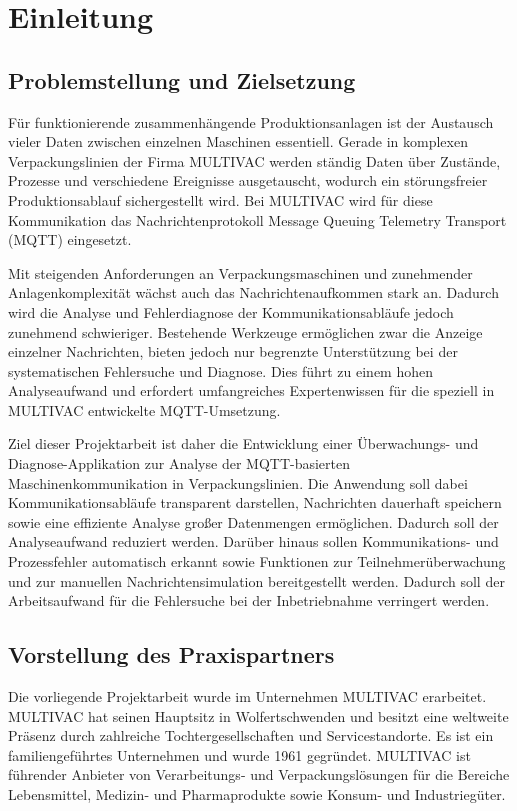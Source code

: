 \chapter{Einleitung}
\label{cha:Einleitung}

\section{Problemstellung und Zielsetzung}
Für funktionierende zusammenhängende Produktionsanlagen ist der Austausch vieler Daten zwischen einzelnen Maschinen essentiell. Gerade in komplexen Verpackungslinien der Firma MULTIVAC werden ständig Daten über Zustände, Prozesse und verschiedene Ereignisse ausgetauscht, wodurch ein störungsfreier Produktionsablauf sichergestellt wird.
Bei MULTIVAC wird für diese Kommunikation das Nachrichtenprotokoll Message Queuing Telemetry Transport (MQTT) eingesetzt.

Mit steigenden Anforderungen an Verpackungsmaschinen und zunehmender Anlagenkomplexität wächst auch das Nachrichtenaufkommen stark an. Dadurch wird die Analyse und Fehlerdiagnose der Kommunikationsabläufe jedoch zunehmend schwieriger. Bestehende Werkzeuge ermöglichen zwar die Anzeige einzelner Nachrichten, bieten jedoch nur begrenzte Unterstützung bei der systematischen Fehlersuche und Diagnose. Dies führt zu einem hohen Analyseaufwand und erfordert umfangreiches Expertenwissen für die speziell in MULTIVAC entwickelte MQTT-Umsetzung.

Ziel dieser Projektarbeit ist daher die Entwicklung einer Überwachungs- und Diagnose-Applikation zur Analyse der MQTT-basierten Maschinenkommunikation in Verpackungslinien. Die Anwendung soll dabei Kommunikationsabläufe transparent darstellen, Nachrichten dauerhaft speichern sowie eine effiziente Analyse großer Datenmengen ermöglichen. Dadurch soll der Analyseaufwand reduziert werden. Darüber hinaus sollen Kommunikations- und Prozessfehler automatisch erkannt sowie Funktionen zur Teilnehmerüberwachung und zur manuellen Nachrichtensimulation bereitgestellt werden. Dadurch soll der Arbeitsaufwand für die Fehlersuche bei der Inbetriebnahme verringert werden.

\section{Vorstellung des Praxispartners}
Die vorliegende Projektarbeit wurde im Unternehmen MULTIVAC erarbeitet. MULTIVAC hat seinen Hauptsitz in Wolfertschwenden und besitzt eine weltweite Präsenz durch zahlreiche Tochtergesellschaften und Servicestandorte. Es ist ein familiengeführtes Unternehmen und wurde 1961 gegründet. MULTIVAC ist führender Anbieter von Verarbeitungs- und Verpackungslösungen für die Bereiche Lebensmittel, Medizin- und Pharmaprodukte sowie Konsum- und Industriegüter. \autocite{UeberUns}

